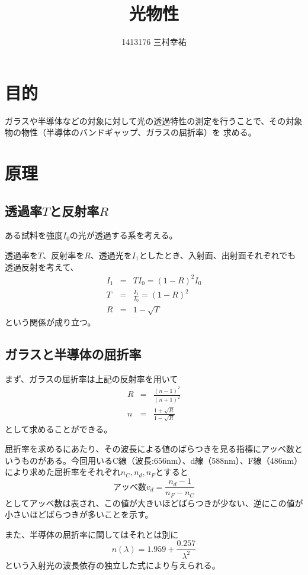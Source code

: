 \documentclass[11pt,a4j]{jsarticle}
\title{光物性}
\author{1413176 三村幸祐}
\date{2016/10/26 \and 2016/11/02}
\begin{document}
  
  
 \section{目的}
  ガラスや半導体などの対象に対して光の透過特性の測定を行うことで、その対象物の物性（半導体のバンドギャップ、ガラスの屈折率）を
  求める。
  
 \section{原理}
  \subsection{透過率$T$と反射率$R$}
   ある試料を強度$I_0$の光が透過する系を考える。
   
   透過率を$T$、反射率を$R$、透過光を$I_1$としたとき、入射面、出射面それぞれでも透過反射を考えて、
   \begin{eqnarray}
    I_1 &=& T I_0 = (1-R)^2 I_0 \\
    T &=& \frac{I_1}{I_0} = (1-R)^2 \\
    R &=& 1-\sqrt{T}
   \end{eqnarray}
   という関係が成り立つ。
   
   
  \subsection{ガラスと半導体の屈折率}
   まず、ガラスの屈折率は上記の反射率を用いて
   \begin{eqnarray}
   R &=& \frac{(n-1)^2}{(n+1)^2} \\
   n &=& \frac{1+\sqrt{R}}{1-\sqrt{R}} 
   \end{eqnarray}
   として求めることができる。
   
   屈折率を求めるにあたり、その波長による値のばらつきを見る指標にアッベ数というものがある。今回用いるC線（波長:656nm）、d線（588nm）、F線（486nm）により求めた屈折率をそれぞれ$n_C,n_d,n_F$とすると
   \begin{equation}
   アッベ数v_d = \frac{n_d - 1}{n_F - n_C}
   \end{equation}
   としてアッベ数は表され、この値が大きいほどばらつきが少ない、逆にこの値が小さいほどばらつきが多いことを示す。
   
   また、半導体の屈折率に関してはそれとは別に
   \begin{equation}
   n(\lambda) = 1.959 + \frac{0.257}{\lambda^2}
   \end{equation}
   という入射光の波長依存の独立した式により与えられる。
   
\end{document}
